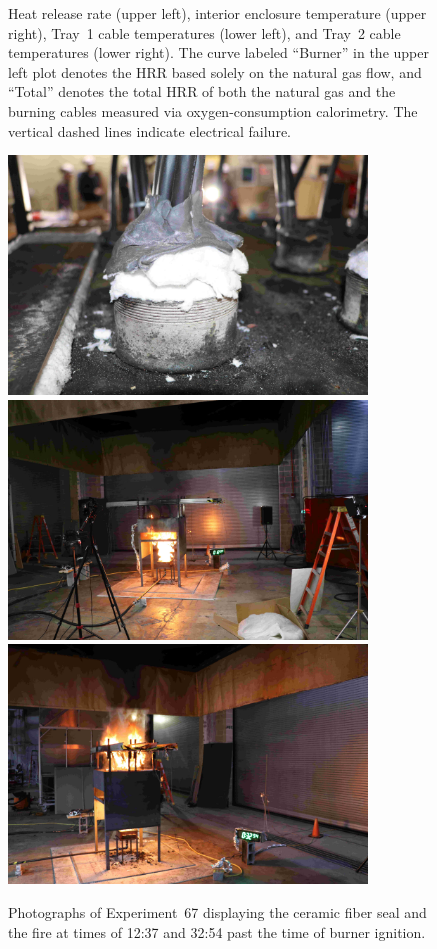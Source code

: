 \begin{figure}[H]
\caption[HRR and temperatures of Experiment 67]{Heat release rate (upper left), interior enclosure temperature (upper right), Tray~1 cable temperatures (lower left), and Tray~2 cable temperatures (lower right). The curve labeled ``Burner'' in the upper left plot denotes the HRR based solely on the natural gas flow, and ``Total'' denotes the total HRR of both the natural gas and the burning cables measured via oxygen-consumption calorimetry. The vertical dashed lines indicate electrical failure.}
\label{fig:Test_67}
\end{figure}

\begin{figure}[p]
\centering
\includegraphics[height=2.50in]{../FIGURES/Test_67_Photo_1} \\ \vspace{0.1in}
\includegraphics[height=2.50in]{../FIGURES/Test_67_Photo_2} \\ \vspace{0.1in}
\includegraphics[height=2.50in]{../FIGURES/Test_67_Photo_3}
\caption[Photographs of Experiment~67]{Photographs of Experiment~67 displaying the ceramic fiber seal and the fire at times of 12:37 and 32:54 past the time of burner ignition.}
\label{fig:Test_67_photos}
\end{figure}



